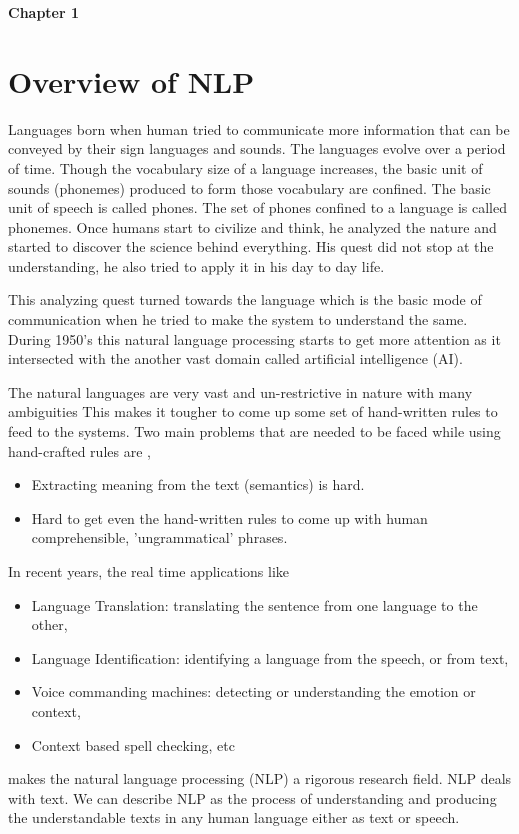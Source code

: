 \documentclass{bmcart}
\begin{document}

\newpage

\begin{center}
\huge {\bf Chapter 1}
\end{center}
\section{Overview of NLP}
\label{sec:overview}
Languages born when human tried to communicate more information that can be 
conveyed by their sign languages and sounds. The languages evolve over a period of
time. Though the vocabulary size of a language increases, the basic unit of sounds 
(phonemes) produced to form those vocabulary are confined. The basic unit of speech is 
called phones. The set of phones confined to a language is called phonemes. Once humans
start to civilize and think, he analyzed the nature and started to discover the science
behind everything. His quest did not stop at the understanding, he also tried to apply
it in his day to day life. 

This analyzing quest turned towards the language which is the basic mode of communication when he tried to make the system to understand the same. During 1950's this natural language processing starts to get more attention as it intersected with the another vast domain called artificial intelligence (AI). 

The natural languages are very vast and un-restrictive in nature with many ambiguities This makes it tougher to come up some set of hand-written rules to feed to the systems. 
Two main problems that are needed to be faced while using hand-crafted rules are \cite{nlpIntro},

\begin{itemize}
\item Extracting meaning from the text (semantics) is hard. 
\item Hard to get even the hand-written rules to come up with human comprehensible,
'ungrammatical' phrases.
\end{itemize}

In recent years, the real time applications like 
\begin{itemize}
\item Language Translation:  translating the sentence from one language to the other, 
\item Language Identification: identifying a language from the speech, or from text,
\item Voice commanding machines: detecting or understanding the emotion or context,
\item Context based spell checking, etc
\end{itemize}
makes the natural language processing (NLP) a rigorous research field. NLP deals with text. We can describe NLP as the process of understanding and producing the understandable texts in any human language either as text or speech.  
\end{document}
